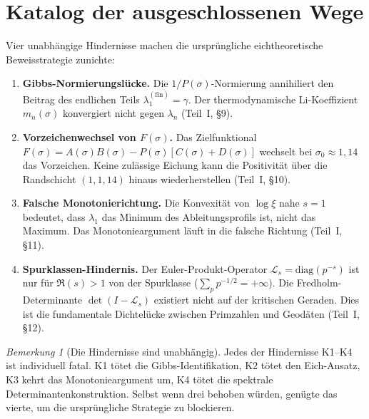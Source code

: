 \documentclass[12pt,a4paper]{article}
\theoremstyle{definition}
\theoremstyle{remark}
\newtheorem{remark}[theorem]{Bemerkung}
\begin{document}
\section{Katalog der ausgeschlossenen Wege}
\label{sec:excluded}

Vier unabhängige Hindernisse machen die ursprüngliche eichtheoretische Beweisstrategie zunichte:
\begin{enumerate}[label=\textbf{K\arabic*},leftmargin=3em]
  \item \textbf{Gibbs-Normierungslücke.} Die $1/P(\sigma)$-Normierung annihiliert den Beitrag des endlichen Teils $\lambda_1^{(\mathrm{fin})} = \gamma$. Der thermodynamische Li-Koeffizient $m_n(\sigma)$ konvergiert nicht gegen $\lambda_n$ (Teil~I, \S9).
  \item \textbf{Vorzeichenwechsel von $F(\sigma)$.} Das Zielfunktional $F(\sigma) = A(\sigma)B(\sigma) - P(\sigma)[C(\sigma) + D(\sigma)]$ wechselt bei $\sigma_0 \approx 1{,}14$ das Vorzeichen. Keine zulässige Eichung kann die Positivität über die Randschicht $(1, 1{,}14)$ hinaus wiederherstellen (Teil~I, \S10).
  \item \textbf{Falsche Monotonierichtung.} Die Konvexität von $\log\xi$ nahe $s = 1$ bedeutet, dass $\lambda_1$ das Minimum des Ableitungsprofils ist, nicht das Maximum. Das Monotonieargument läuft in die falsche Richtung (Teil~I, \S11).
  \item \textbf{Spurklassen-Hindernis.} Der Euler-Produkt-Operator $\mathcal{L}_s = \mathrm{diag}(p^{-s})$ ist nur für $\Re(s) > 1$ von der Spurklasse ($\sum_p p^{-1/2} = +\infty$). Die Fredholm-Determinante $\det(I - \mathcal{L}_s)$ existiert nicht auf der kritischen Geraden. Dies ist die fundamentale Dichtelücke zwischen Primzahlen und Geodäten (Teil~I, \S12).
\end{enumerate}

\begin{remark}[Die Hindernisse sind unabhängig]
Jedes der Hindernisse K1--K4 ist individuell fatal. K1 tötet die Gibbs-Identifikation, K2 tötet den Eich-Ansatz, K3 kehrt das Monotonieargument um, K4 tötet die spektrale Determinantenkonstruktion. Selbst wenn drei behoben würden, genügte das vierte, um die ursprüngliche Strategie zu blockieren.
\end{remark}
\end{document}
